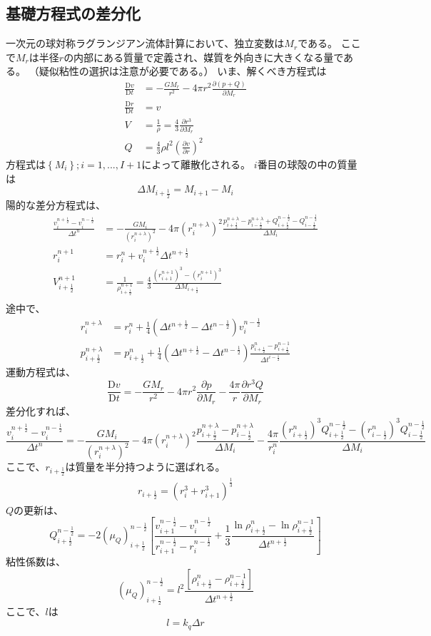 \documentclass{jsarticle}
\newcommand{\pder}[2][]{\frac{\partial#1}{\partial#2}}
\newcommand{\Dder}[2][]{\frac{\mathrm{D}#1}{\mathrm{D}#2}}
\newcommand{\half}{\frac{1}{2}}
\newcommand{\hpn}{n + \half}
\newcommand{\hmn}{n - \half}
\newcommand{\hpi}{i + \half}
\newcommand{\hmi}{i - \half}
\newcommand{\beq}{\begin{equation}}
\newcommand{\eeq}{\end{equation}}
\begin{document}
\subsection{基礎方程式の差分化}
一次元の球対称ラグランジアン流体計算において、独立変数は$M_r$である。
ここで$M_r$は半径$r$の内部にある質量で定義され、媒質を外向きに大きくなる量である。
（疑似粘性の選択は注意が必要である。）
いま、解くべき方程式は
\begin{align}
    \Dder[v]{t} &= - \frac{GM_r}{r^2} - 4\pi r^2\pder[(p + Q)]{M_r}\\
    \Dder[r]{t} &= v\\
    V &= \frac{1}{\rho}=\frac{4}{3}\pder[r^3]{M_r}\\
    Q &= \frac{4}{3}\rho l^2 (\pder[v]{r})^2\label{eq:q}
\end{align}
方程式は$\left\{M_i\right\};i = 1,...,I+1$によって離散化される。
$i$番目の球殻の中の質量は
\beq
    \Delta M_{i+\half} = M_{i+1} - M_i
\eeq
陽的な差分方程式は、
\begin{align}
    \frac{v^{n+\half}_i - v^{n-\half}_i}{\Delta t^n} &= -\frac{GM_i}{(r^{n+\lambda}_i)^2}
    -4\pi(r^{n+\lambda}_i)^2
    \frac{p^{n+\lambda}_{i+\half} - p^{n+\lambda}_{i-\half}+Q^{n-\half}_{i+\half} - Q^{n-\half}_{i-\half}}{\Delta M_i}\\
    r^{n+1}_i &= r^{n}_i + v^{\hpn}_i \Delta t^{\hpn}\\
    V^{n+1}_{\hpi} &= \frac{1}{\rho^{n+1}_{\hpi}}=\frac{4}{3}\frac{(r^{n+1}_{i+1})^3 - (r^{n+1}_{i})^3}{\Delta M_{\hpi}}\\
\end{align}
途中で、
\begin{align}
    r^{n+\lambda}_i &= r^n_i + \frac{1}{4} (\Delta t^{n+\half} - \Delta t^{n-\half})v^{n-\half}_i\\
    p^{n+\lambda}_{\hpi} &=  p^{n}_{\hpi} + \frac{1}{4} (\Delta t^{n+\half} - \Delta t^{n-\half})
    \frac{p^{n}_{\hpi} - p^{n-1}_{\hpi}}{\Delta t^{\hmi}}
\end{align}
運動方程式は、
\beq
    \Dder[v]{t} = - \frac{GM_r}{r^2} - 4\pi r^2\pder[p]{M_r} - \frac{4\pi}{r}\pder[r^3Q]{M_r}
\eeq
差分化すれば、
\beq
    \frac{v^{n+\half}_i - v^{n-\half}_i}{\Delta t^n} =
    -\frac{GM_i}{(r^{n+\lambda}_i)^2}
    -4\pi(r^{n+\lambda}_i)^2
    \frac{p^{n+\lambda}_{i+\half} - p^{n+\lambda}_{i-\half}}{\Delta M_i}
    -\frac{4\pi}{r^{n}_i}
    \frac{(r^{n}_{i+\half})^3Q^{n-\half}_{i+\half} - (r^{n}_{i-\half})^3Q^{n-\half}_{i-\half}}{\Delta M_i}
\eeq
ここで、$r_{i+\half}$は質量を半分持つように選ばれる。
\begin{align}
    r_{i+\half} = (r^3_i + r^3_{i+1})^{\frac{1}{3}}
\end{align}
$Q$の更新は、
\beq
    Q^{\hmn}_{\hpi} = - 2 (\mu_Q)^{\hmn}_{\hpi}
     \left[\frac{v^{\hmn}_{i+1}-v^{\hmn}_{i}}{r^{\hmn}_{i+1}-r^{\hmn}_{i}}
      +\frac{1}{3}\frac{\ln \rho^{n}_{\hpi} - \ln \rho^{n-1}_{\hpi}}{\Delta t^{\hpn}}\right]
\eeq
粘性係数は、
\beq
    (\mu_Q)^{n-\half}_{i+\half} = 
    l^2 \frac{\left[ \rho^n_{\hpi} - \rho^{n-1}_{\hpi}\right]}{\Delta t^{\hpn}}
\eeq
ここで、$l$は
\beq
    l = k_q \Delta r
\eeq
\end{document}
